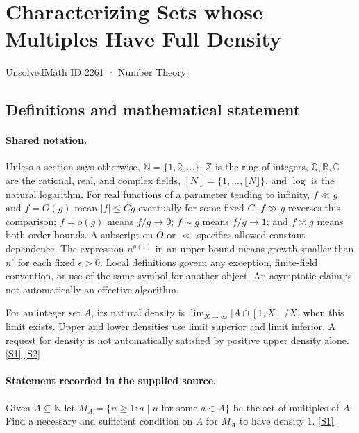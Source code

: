 \documentclass[11pt,a4paper]{article}
\newcommand{\N}{\mathbb{N}}
\newcommand{\Z}{\mathbb{Z}}
\newcommand{\Q}{\mathbb{Q}}
\newcommand{\R}{\mathbb{R}}
\newcommand{\C}{\mathbb{C}}
\newcommand{\sref}[2]{\hyperlink{source:#1:#2}{[S#2]}}
\begin{document}

\setcounter{section}{2260}

\section{Characterizing Sets whose Multiples Have Full Density}\label{2261}

{\small\sffamily UnsolvedMath ID 2261 · Number Theory}

\subsection{Definitions and mathematical statement}

\paragraph{Shared notation.}Unless a section says otherwise, $\N=\{1,2,\ldots\}$,
$\Z$ is the ring of integers, $\Q,\R,\C$ are the rational, real, and complex
fields, $[N]=\{1,\ldots,\lfloor N\rfloor\}$, and $\log$ is the natural
logarithm. For real functions of a parameter tending to infinity,
$f\ll g$ and $f=O(g)$ mean $|f|\leq Cg$ eventually for some fixed $C$;
$f\gg g$ reverses this comparison; $f=o(g)$ means $f/g\to0$;
$f\sim g$ means $f/g\to1$; and $f\asymp g$ means both order bounds.
A subscript on $O$ or $\ll$ specifies allowed constant dependence.
The expression $n^{o(1)}$ in an upper bound means growth smaller than
$n^\epsilon$ for each fixed $\epsilon>0$. Local definitions govern any
exception, finite-field convention, or use of the same symbol for another
object. An asymptotic claim is not automatically an effective algorithm.



For an integer set $A$, its natural density is $\lim_{X\to\infty}|A\cap[1,X]|/X$, when this limit exists. Upper and lower densities use limit superior and limit inferior. A request for density is not automatically satisfied by positive upper density alone. \sref{2261}{1} \sref{2261}{2}

\paragraph{Statement recorded in the supplied source.}
Given $A\subseteq \mathbb{N}$ let $M_A=\{ n \geq 1 : a\mid n\textrm{ for some }a\in A\}$ be the set of multiples of $A$. Find a necessary and sufficient condition on $A$ for $M_A$ to have density $1$. \sref{2261}{1}
\end{document}
